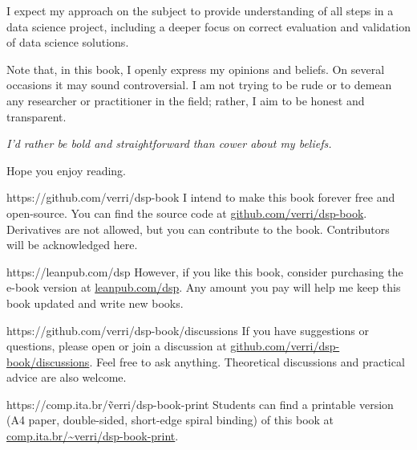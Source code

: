 I expect my approach on the subject to provide understanding of all steps in a data
science project, including a deeper focus on correct evaluation and validation of data
science solutions.

Note that, in this book, I openly express my opinions and beliefs. On several occasions it
may sound controversial.  I am not trying to be rude or to demean any researcher or
practitioner in the field; rather, I aim to be honest and transparent.

\vspace{1em}
\emph{I'd rather be bold and straightforward than cower about my beliefs.}
\vspace{1em}

Hope you enjoy reading.

\newpage

\begin{parwithqr}{https://github.com/verri/dsp-book}
  I intend to make this book forever free and open-source. You can find the source code at
  \href{\aurl}{github.com/verri/dsp-book}. Derivatives are not allowed, but you can
  contribute to the book. Contributors will be acknowledged here.
\end{parwithqr}

\vfill

\begin{lparwithqr}{https://leanpub.com/dsp}
  However, if you like this book, consider purchasing the e-book version at
  \href{\aurl}{leanpub.com/dsp}. Any amount you pay will help me keep this book updated
  and write new books.
\end{lparwithqr}

\vfill

\begin{parwithqr}{https://github.com/verri/dsp-book/discussions}
  If you have suggestions or questions, please open or join a discussion at
  \href{\aurl}{github.com/verri/dsp-book/discussions}. Feel free to ask anything.
  Theoretical discussions and practical advice are also welcome.
\end{parwithqr}

\vfill

\begin{lparwithqr}{https://comp.ita.br/\~verri/dsp-book-print}
  Students can find a printable version (A4 paper, double-sided, short-edge spiral
  binding) of this book at
  \href{\aurl}{comp.ita.br/\textasciitilde{}verri/dsp-book-print}.
\end{lparwithqr}

